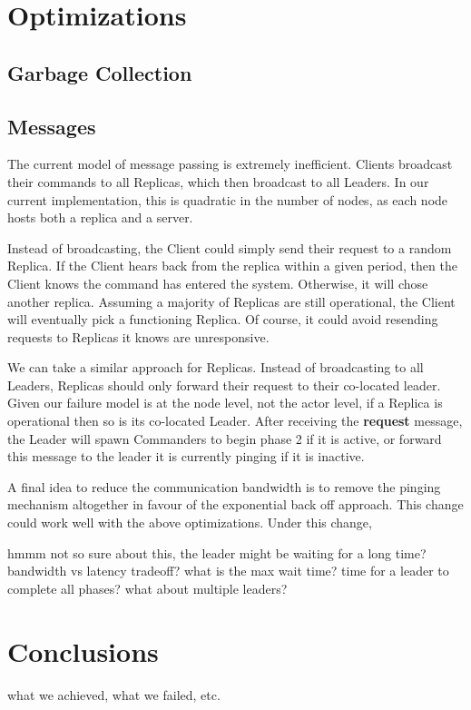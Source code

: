 \documentclass{sig-alternate}
\begin{document}
\section{Optimizations}

\subsection{Garbage Collection}

\subsection{Messages}

The current model of message passing is extremely inefficient. Clients broadcast their commands to all Replicas, which then broadcast to all Leaders. In our current implementation, this is quadratic in the number of nodes, as each node hosts both a replica and a server. 

Instead of broadcasting, the Client could simply send their request to a random Replica. If the Client hears back from the replica within a given period, then the Client knows the command has entered the system. Otherwise, it will chose another replica. Assuming a majority of Replicas are still operational, the Client will eventually pick a functioning Replica. Of course, it could avoid resending requests to Replicas it knows are unresponsive.

We can take a similar approach for Replicas. Instead of broadcasting to all Leaders, Replicas should only forward their request to their co-located leader. Given our failure model is at the node level, not the actor level, if a Replica is operational then so is its co-located Leader. After receiving the \textbf{request} message, the Leader will spawn Commanders to begin phase 2 if it is active, or forward this message to the leader it is currently pinging if it is inactive.

A final idea to reduce the communication bandwidth is to remove the pinging mechanism altogether in favour of the exponential back off approach. This change could work well with the above optimizations. Under this change, 

hmmm not so sure about this, the leader might be waiting for a long time? bandwidth vs latency tradeoff? what is the max wait time? time for a leader to complete all phases? what about multiple leaders?

\section{Conclusions}
what we achieved, what we failed, etc.



%
%
\end{document}
